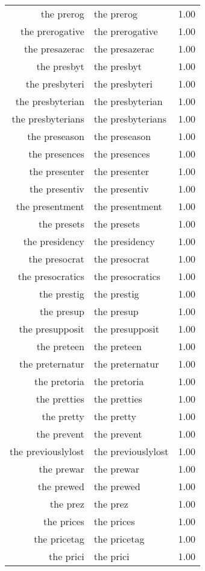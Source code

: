 \begin{table}[ht]
\begin{tabular}{rlr}
  the prerog & the prerog & 1.00 \\ 
  the prerogative & the prerogative & 1.00 \\ 
  the presazerac & the presazerac & 1.00 \\ 
  the presbyt & the presbyt & 1.00 \\ 
  the presbyteri & the presbyteri & 1.00 \\ 
  the presbyterian & the presbyterian & 1.00 \\ 
  the presbyterians & the presbyterians & 1.00 \\ 
  the preseason & the preseason & 1.00 \\ 
  the presences & the presences & 1.00 \\ 
  the presenter & the presenter & 1.00 \\ 
  the presentiv & the presentiv & 1.00 \\ 
  the presentment & the presentment & 1.00 \\ 
  the presets & the presets & 1.00 \\ 
  the presidency & the presidency & 1.00 \\ 
  the presocrat & the presocrat & 1.00 \\ 
  the presocratics & the presocratics & 1.00 \\ 
  the prestig & the prestig & 1.00 \\ 
  the presup & the presup & 1.00 \\ 
  the presupposit & the presupposit & 1.00 \\ 
  the preteen & the preteen & 1.00 \\ 
  the preternatur & the preternatur & 1.00 \\ 
  the pretoria & the pretoria & 1.00 \\ 
  the pretties & the pretties & 1.00 \\ 
  the pretty & the pretty & 1.00 \\ 
  the prevent & the prevent & 1.00 \\ 
  the previouslylost & the previouslylost & 1.00 \\ 
  the prewar & the prewar & 1.00 \\ 
  the prewed & the prewed & 1.00 \\ 
  the prez & the prez & 1.00 \\ 
  the prices & the prices & 1.00 \\ 
  the pricetag & the pricetag & 1.00 \\ 
  the prici & the prici & 1.00 \\ 

\end{tabular}
\end{table}
